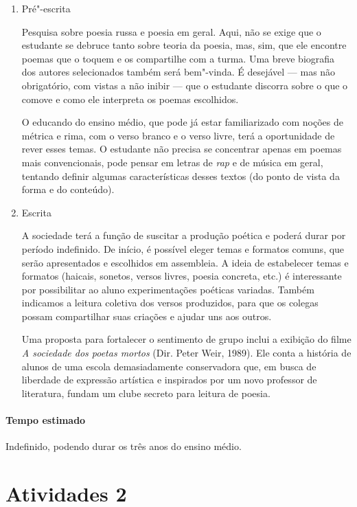 \documentclass[11pt]{extarticle}
\begin{document}
\begin{enumerate}
\item
Pré"-escrita

Pesquisa sobre poesia russa e poesia em geral. Aqui, não se exige que
o estudante se debruce tanto sobre teoria da poesia, mas, sim, que ele
encontre poemas que o toquem e os compartilhe com a turma. Uma breve
biografia dos autores selecionados também será bem"-vinda. É desejável
--- mas não obrigatório, com vistas a não inibir --- que o estudante
discorra sobre o que o comove e como ele interpreta os poemas
escolhidos.

O educando do ensino médio, que pode já estar familiarizado com noções
de métrica e rima, com o verso branco e o verso livre, terá a
oportunidade de rever esses temas. O estudante não precisa se concentrar
apenas em poemas mais convencionais, pode pensar em letras de \emph{rap}
e de música em geral, tentando definir algumas características desses
textos (do ponto de vista da forma e do conteúdo).

\item
Escrita

A sociedade terá a função de suscitar a produção poética e poderá durar
por período indefinido. De início, é possível eleger temas e formatos
comuns, que serão apresentados e escolhidos em assembleia. A ideia de
estabelecer temas e formatos (haicais, sonetos, versos livres, poesia
concreta, etc.) é interessante por possibilitar ao aluno experimentações
poéticas variadas. Também indicamos a leitura coletiva dos versos
produzidos, para que os colegas possam compartilhar suas criações e
ajudar uns aos outros.

Uma proposta para fortalecer o sentimento de grupo inclui a exibição do
filme \emph{A sociedade dos poetas mortos} (Dir. Peter Weir, 1989).
Ele conta a história de alunos de uma escola demasiadamente conservadora
que, em busca de liberdade de expressão artística e inspirados por um
novo professor de literatura, fundam um clube secreto para leitura de
poesia.
\end{enumerate}

\paragraph{Tempo estimado} Indefinido, podendo durar os três anos do
ensino médio.

\section{Atividades 2}
\end{document}

